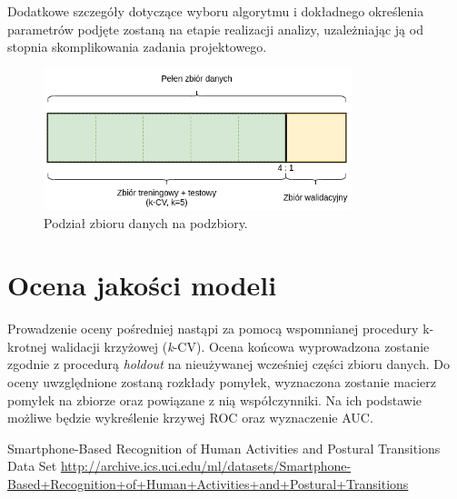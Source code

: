 \documentclass[a4paper,10pt]{article}
\begin{document}
		Dodatkowe szczegóły dotyczące wyboru algorytmu i dokładnego określenia parametrów podjęte zostaną na etapie realizacji analizy, uzależniając ją od stopnia skomplikowania zadania projektowego.
		
    \begin{figure}[h]
        \centering
        \includegraphics[width=0.8\textwidth]{Podzial_zbioru.png}
        \caption{Podział zbioru danych na podzbiory.}
        \label{fig:podzial}
    \end{figure}
    
 	\section{Ocena jakości modeli}
 	Prowadzenie oceny pośredniej nastąpi za pomocą wspomnianej procedury k-krotnej walidacji krzyżowej (\emph{k}-CV). Ocena końcowa wyprowadzona zostanie zgodnie z procedurą \emph{holdout} na nieużywanej wcześniej części zbioru danych.
 	Do oceny uwzględnione zostaną rozkłady pomyłek, wyznaczona zostanie macierz pomyłek na zbiorze oraz powiązane z nią współczynniki. Na ich podstawie możliwe będzie wykreślenie krzywej ROC oraz wyznaczenie AUC.
 		
 		
\begin{thebibliography}{9}
Smartphone-Based Recognition of Human Activities and Postural Transitions Data Set 
\url{http://archive.ics.uci.edu/ml/datasets/Smartphone-Based+Recognition+of+Human+Activities+and+Postural+Transitions}

\end{thebibliography}
\end{document}
